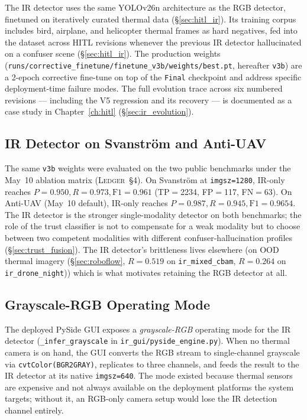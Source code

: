 \documentclass[12pt,a4paper,oneside,openright]{book}
\begin{document}
The IR detector uses the same YOLOv26n architecture as the RGB detector, finetuned on iteratively curated thermal data (\S\ref{sec:hitl_ir}). Its training corpus includes bird, airplane, and helicopter thermal frames as hard negatives, fed into the dataset across HITL revisions whenever the previous IR detector hallucinated on a confuser scene (\S\ref{sec:hitl_ir}). The production weights (\texttt{runs/corrective\_finetune/finetune\_v3b/weights/best.pt}, hereafter \texttt{v3b}) are a 2-epoch corrective fine-tune on top of the \texttt{Final} checkpoint and address specific deployment-time failure modes. The full evolution trace across six numbered revisions --- including the V5 regression and its recovery --- is documented as a case study in Chapter~\ref{ch:hitl} (\S\ref{sec:ir_evolution}).

\subsection{IR Detector on Svanstr\"om and Anti-UAV}

The same \texttt{v3b} weights were evaluated on the two public benchmarks under the May~10 ablation matrix (\textsc{Ledger}~\S4). On Svanstr\"om at \texttt{imgsz=1280}, IR-only reaches $P=0.950, R=0.973, \text{F1}=0.961$ (TP$=$2234, FP$=$117, FN$=$63). On Anti-UAV (May~10 default), IR-only reaches $P=0.987, R=0.945, \text{F1}=0.9654$. The IR detector is the stronger single-modality detector on both benchmarks; the role of the trust classifier is not to compensate for a weak modality but to choose between two competent modalities with different confuser-hallucination profiles (\S\ref{sec:trust_fusion}). The IR detector's brittleness lives elsewhere (on OOD thermal imagery (\S\ref{sec:roboflow}, $R=0.519$ on \texttt{ir\_mixed\_cbam}, $R=0.264$ on \texttt{ir\_drone\_night})) which is what motivates retaining the RGB detector at all.

\subsection{Grayscale-RGB Operating Mode}
\label{sec:ir_grayscale_mode}

The deployed PySide GUI exposes a \emph{grayscale-RGB} operating mode for the IR detector (\texttt{\_infer\_grayscale} in \texttt{ir\_gui/pyside\_engine.py}). When no thermal camera is on hand, the GUI converts the RGB stream to single-channel grayscale via \texttt{cvtColor(BGR2GRAY)}, replicates to three channels, and feeds the result to the IR detector at its native \texttt{imgsz=640}. The mode existed because thermal sensors are expensive and not always available on the deployment platforms the system targets; without it, an RGB-only camera setup would lose the IR detection channel entirely.
\end{document}
